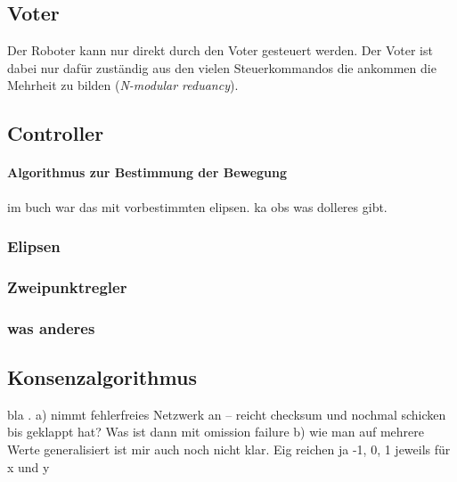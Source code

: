 \documentclass[
    12pt,
    bibliography=totoc,
    ngerman
]{scrartcl}
\begin{document}
{\subsection{Voter}
\label{voter}
Der Roboter kann nur direkt durch den Voter gesteuert werden. Der Voter ist dabei nur daf{\"{u}}r zust{\"{a}}ndig aus den vielen Steuerkommandos die ankommen die Mehrheit zu bilden (\textit{N-modular reduancy}).

\subsection{Controller}
\label{controller}
\paragraph{Algorithmus zur Bestimmung der Bewegung} im buch war das mit vorbestimmten elipsen. ka obs was dolleres gibt.

\subsubsection{Elipsen}
\subsubsection{Zweipunktregler}
\subsubsection{was anderes}

\subsection{Konsenzalgorithmus}
bla \cite{efficent-consens}. a) nimmt fehlerfreies Netzwerk an -- reicht checksum und nochmal schicken bis geklappt hat? Was ist dann mit omission failure
b) wie man auf mehrere Werte generalisiert ist mir auch noch nicht klar. Eig reichen ja {-1, 0, 1} jeweils f{\"{u}}r x und y

}
\end{document}
